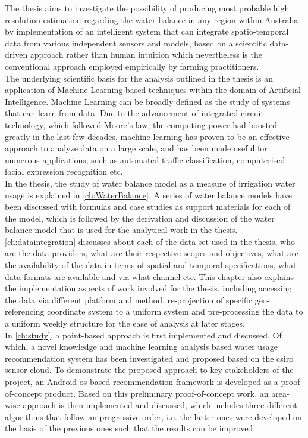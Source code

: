 \newline
The thesis aims to investigate the possibility of producing most probable high resolution estimation regarding the water balance in any region within Australia by implementation of an intelligent system that can integrate spatio-temporal data from various independent sensors and models, based on a scientific data-driven approach rather than human intuition which nevertheless is the conventional approach employed empirically by farming practitioners.\\
\newline
The underlying scientific basis for the analysis outlined in the thesis is an application of Machine Learning based techniques within the domain of Artificial Intelligence. Machine Learning can be broadly defined as the study of systems that can learn from data. Due to the advancement of integrated circuit technology, which followed Moore's law, the computing power had boosted greatly in the last few decades, machine learning has proven to be an effective approach to analyze data on a large scale, and has been made useful for numerous applications, such as automated traffic classification\citep{Zander2005}, computerised facial expression recognition etc\citep{Bartlett2005}.\\
\newline
In the thesis, the study of water balance model as a measure of irrigation water usage is explained in \autoref{ch:WaterBalance}. A series of water balance models have been discussed with formulas and case studies as support materials for each of the model, which is followed by the derivation and discussion of the water balance model that is used for the analytical work in the thesis.\\
\newline
\autoref{ch:dataintegration} discusses about each of the data set used in the thesis, who are the data providers, what are their respective scopes and objectives, what are the availability of the data in terms of spatial and temporal specifications, what data formats are available and via what channel etc. This chapter also explains the implementation aspects of work involved for the thesis, including accessing the data via different platform and method, re-projection of specific geo-referencing coordinate system to a uniform system and pre-processing the data to a uniform weekly structure for the ease of analysis at later stages.\\ 
\newline
In \autoref{ch:study}, a point-based approach is first implemented and discussed. Of which, a novel knowledge and machine learning analysis based water usage recommendation system has been investigated and proposed based on the \ac{csiro} sensor cloud. To demonstrate the proposed approach to key stakeholders of the project, an Android \ac{os} based recommendation framework is developed as a proof-of-concept product. Based on this preliminary proof-of-concept work, an area-wise approach is then implemented and discussed, which includes three different algorithms that follow an progressive order, i.e. the latter ones were developed on the basis of the previous ones such that the results can be improved.\\
